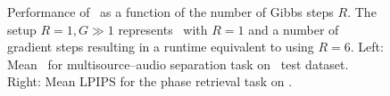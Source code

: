 \begin{figure}
    \centering
    \renewcommand{\arraystretch}{1.2} %
    \vspace*{-1mm}
    \captionsetup{font=small}
    \caption{Performance of \algo\ as a function of the number of Gibbs steps $R$.
    The setup $R=1,G\gg1$ represents \algo\ with $R=1$ and a number of gradient steps resulting in a runtime equivalent to using $R=6$.
    Left: Mean \sisdri\ for multisource--audio separation task on \slakh\ test dataset.
    Right: Mean LPIPS for the phase retrieval task on \ffhq.}
    \vspace*{-3mm}
    \label{fig:scaling}
\end{figure}

